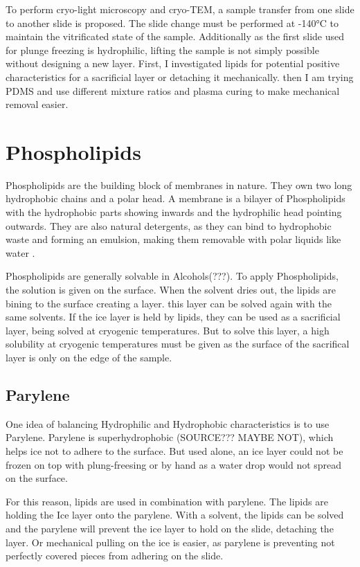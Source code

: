 To perform cryo-light microscopy and cryo-TEM, a sample transfer from one slide to another slide is proposed. The slide change must be performed at -140°C to maintain the vitrificated state of the sample. Additionally as the first slide used for plunge freezing is hydrophilic, lifting the sample is not simply possible without designing a new layer. First, I investigated lipids for potential positive characteristics for a sacrificial layer or detaching it mechanically. then I am trying PDMS and use different mixture ratios and plasma curing to make mechanical removal easier.

\section{Phospholipids}

Phospholipids are the building block of membranes in nature. They own two long hydrophobic chains and a polar head. A membrane is a bilayer of Phospholipids with the hydrophobic parts showing inwards and the hydrophilic head pointing outwards. They are also natural detergents, as they can bind to hydrophobic waste and forming an emulsion, making them removable with polar liquids like water \cite{SriramaM.BhairiPh.D..}.

Phospholipids are generally solvable in Alcohols(???). To apply Phospholipids, the solution is given on the surface. When the solvent dries out, the lipids are bining to the surface creating a layer. this layer can be solved again with the same solvents. If the ice layer is held by lipids, they can be used as a sacrificial layer, being solved at cryogenic temperatures. But to solve this layer, a high solubility at cryogenic temperatures must be given as the surface of the sacrifical layer is only on the edge of the sample.

\subsection{Parylene}

One idea of balancing Hydrophilic and Hydrophobic characteristics is to use Parylene. Parylene is superhydrophobic (SOURCE??? MAYBE NOT), which helps ice not to adhere to the surface. But used alone, an ice layer could not be frozen on top with plung-freesing or by hand as a water drop would not spread on the surface. 

For this reason, lipids are used in combination with parylene. The lipids are holding the Ice layer onto the parylene. With a solvent, the lipids can be solved and the parylene will prevent the ice layer to hold on the slide, detaching the layer. Or mechanical pulling on the ice is easier, as parylene is preventing not perfectly covered pieces from adhering on the slide.

